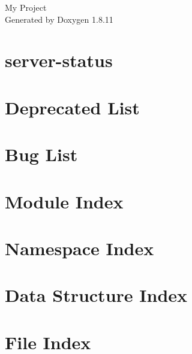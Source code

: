 \documentclass[twoside]{book}
\newcommand{\+}{\discretionary{\mbox{\scriptsize$\hookleftarrow$}}{}{}}
\newcommand{\clearemptydoublepage}{%
  \newpage{\pagestyle{empty}\cleardoublepage}%
}
\begin{document}
\hypersetup{pageanchor=false,
             bookmarksnumbered=true,
             pdfencoding=unicode
            }
\begin{titlepage}
\vspace*{7cm}
\begin{center}%
{\Large My Project }\\
\vspace*{1cm}
{\large Generated by Doxygen 1.8.11}\\
\end{center}
\end{titlepage}
\clearemptydoublepage
\tableofcontents
\clearemptydoublepage
{}
\hypersetup{pageanchor=true}

\chapter{server-\/status}
\label{md__usr_local_src_github_Codebase_httpd-2.4.29_docs_server-status_README}
\hypertarget{md__usr_local_src_github_Codebase_httpd-2.4.29_docs_server-status_README}{}

\chapter{Deprecated List}
\label{deprecated}
\hypertarget{deprecated}{}

\chapter{Bug List}
\label{bug}
\hypertarget{bug}{}

\chapter{Module Index}

\chapter{Namespace Index}

\chapter{Data Structure Index}

\chapter{File Index}

\end{document}
